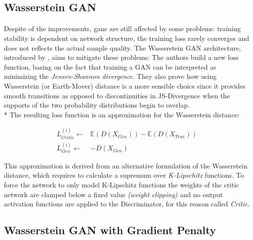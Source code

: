 \subsection{Wasserstein GAN}
\paragraph{} Despite of the improvements, \glspl{gan} are still affected by some problems: training stability is dependent on network structure, the training loss rarely converges and does not reflects the actual sample quality. The Wasserstein GAN architecture, introduced by \citeauthor{wgan} \cite{wgan}, aims to mitigate these problems: The authors build a new loss function, basing on the fact that training a GAN can be interpreted as minimizing the \textit{Jensen-Shannon divergence}\cite{jsdivergence}. They also prove how using Wasserstein (or Earth-Mover) \cite[\S~3]{wgan} distance is a more sensible choice since it provides smooth transitions as opposed to discontinuities in JS-Divergence when the supports of the two probability distributions begin to overlap. \\* The resulting loss function is an approximation for the Wasserstein distance:

\begin{equation}
\label{eq:wganloss}
\begin{split}
L_{Critic}^{(i)} \gets & \mathbb{E}(D(X_{Gen})) - \mathbb{E}(D(X_{True}))\\
L_{Gen}^{(i)} \gets & -D(X_{Gen}) 
\end{split}
\end{equation}

This approximation is derived from an alternative formulation of the Wasserstein distance, which requires to calculate a supremum over \textit{K-Lipschitz} functions. To force the network to only model K-Lipschitz functions the weights of the critic network are clamped below a fixed value \textit{(weight clipping)} and no output activation functions are applied to the Discriminator, for this reason called \textit{Critic}.  

\subsection{Wasserstein GAN with Gradient Penalty}
\label{sec:wgangp}
